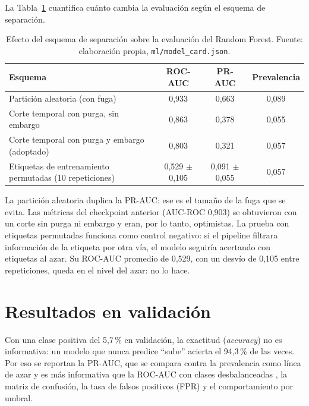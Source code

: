 La Tabla~\ref{tab:control-fuga} cuantifica cuánto cambia la evaluación según el esquema de separación.

\begin{table}[H]
	\centering
	\small
	\caption{Efecto del esquema de separación sobre la evaluación del Random Forest. Fuente: elaboración propia, \texttt{ml/model\_card.json}.}
	\label{tab:control-fuga}
	\begin{tabularx}{\textwidth}{@{}X ccc@{}}
		\toprule
		\textbf{Esquema} & \textbf{ROC-AUC} & \textbf{PR-AUC} & \textbf{Prevalencia} \\
		\midrule
		Partición aleatoria (con fuga) & 0,933 & 0,663 & 0,089 \\
		Corte temporal con purga, sin embargo & 0,863 & 0,378 & 0,055 \\
		Corte temporal con purga y embargo (adoptado) & 0,803 & 0,321 & 0,057 \\
		Etiquetas de entrenamiento permutadas (10 repeticiones) & 0,529 $\pm$ 0,105 & 0,091 $\pm$ 0,055 & 0,057 \\
		\bottomrule
	\end{tabularx}
\end{table}

La partición aleatoria duplica la PR-AUC: ese es el tamaño de la fuga que se evita. Las métricas del checkpoint anterior (AUC-ROC 0,903) se obtuvieron con un corte sin purga ni embargo y eran, por lo tanto, optimistas. La prueba con etiquetas permutadas funciona como control negativo: si el pipeline filtrara información de la etiqueta por otra vía, el modelo seguiría acertando con etiquetas al azar. Su ROC-AUC promedio de 0,529, con un desvío de 0,105 entre repeticiones, queda en el nivel del azar: no lo hace.

\section{Resultados en validación}\label{sec:ml-resultados}

Con una clase positiva del 5,7\,\% en validación, la exactitud (\emph{accuracy}) no es informativa: un modelo que nunca predice ``sube'' acierta el 94,3\,\% de las veces. Por eso se reportan la PR-AUC, que se compara contra la prevalencia como línea de azar y es más informativa que la ROC-AUC con clases desbalanceadas \parencite{SaitoRehmsmeier2015}, la matriz de confusión, la tasa de falsos positivos (FPR) y el comportamiento por umbral.

